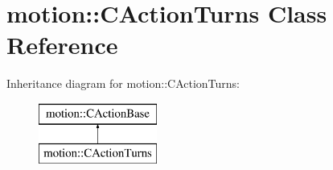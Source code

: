 \hypertarget{classmotion_1_1CActionTurns}{}\section{motion\+:\+:C\+Action\+Turns Class Reference}
\label{classmotion_1_1CActionTurns}
Inheritance diagram for motion\+:\+:C\+Action\+Turns\+:\begin{figure}[H]
\begin{center}
\leavevmode
\includegraphics[height=2.000000cm]{classmotion_1_1CActionTurns}
\end{center}
\end{figure}
